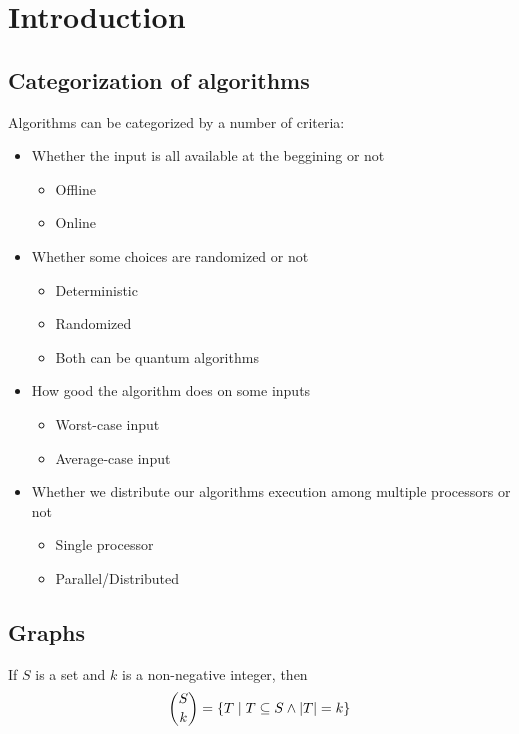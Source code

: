 \section{Introduction}\label{sec:introduction}

\subsection{Categorization of algorithms}
    Algorithms can be categorized by a number of criteria:
    \begin{itemize}
        \item Whether the input is all available at the beggining or not
            \begin{itemize}
                \item Offline
                \item Online
            \end{itemize}
        \item Whether some choices are randomized or not
            \begin{itemize}
                \item Deterministic
                \item Randomized
                \item Both can be quantum algorithms
            \end{itemize}
        \item How good the algorithm does on some inputs
            \begin{itemize}
                \item Worst-case input
                \item Average-case input
            \end{itemize}
        \item Whether we distribute our algorithms execution among multiple processors or not 
            \begin{itemize}
                \item Single processor
                \item Parallel/Distributed
            \end{itemize}
    \end{itemize}

\subsection{Graphs}
    If $S$ is a set and $k$ is a non-negative integer, then
    \[ \binom{S}{k} = \{ T \; \vert \; T \subseteq S \wedge \vert T \vert = k \} \]

